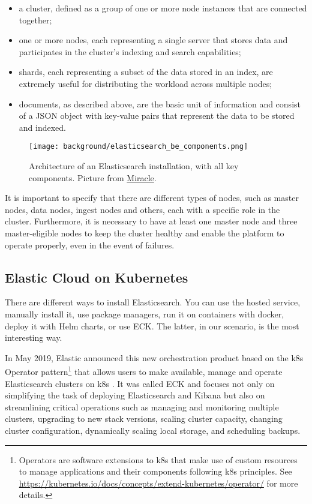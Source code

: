 \documentclass[../thesis.tex]{subfiles}
\begin{document}
\begin{itemize}
    \item a cluster, defined as a group of one or more node instances that are connected together;
    \item one or more nodes, each representing a single server that stores data and participates in the cluster's indexing and search capabilities;
    \item shards, each representing a subset of the data stored in an index, are extremely useful for distributing the workload across multiple nodes;
    \item documents, as described above, are the basic unit of information and consist of a \acrshort{JSON} object with key-value pairs that represent the data to be stored and indexed.
\end{itemize}

\begin{figure}[H]
    \centering
    \texttt{[image: background/elasticsearch\_be\_components.png]}
    \caption[Elasticsearch backend components]{Architecture of an Elasticsearch installation, with all key components. Picture from \href{https://blog.miraclesoft.com/wp-content/uploads/2023/08/xelasticsearch-image-1-1024x643.png.pagespeed.ic.DhHOg8eTFd.webp}{Miracle}.}
    \label{fig:elasticsearch_be_components}
\end{figure}

It is important to specify that there are different types of nodes, such as master nodes, data nodes, ingest nodes and others, each with a specific role in the cluster. Furthermore, it is necessary to have at least one master node and three master-eligible nodes to keep the cluster healthy and enable the platform to operate properly, even in the event of failures.

\subsection{Elastic Cloud on Kubernetes}
There are different ways to install Elasticsearch. You can use the hosted service, manually install it, use package managers, run it on \gls{container}s with \gls{docker}, deploy it with Helm charts, or use \acrfull{ECK}. The latter, in our scenario, is the most interesting way.

In May 2019, Elastic announced this new orchestration product based on the \gls{k8s} Operator pattern\footnote{Operators are software extensions to \gls{k8s} that make use of custom resources to manage applications and their components following \gls{k8s} principles. See \href{https://kubernetes.io/docs/concepts/extend-kubernetes/operator/}{https://kubernetes.io/docs/concepts/extend-kubernetes/operator/} for more details.} that allows users to make available, manage and operate Elasticsearch clusters on \gls{k8s} \cite{site:elasticsearch_kubernetes}. It was called \acrshort{ECK} and focuses not only on simplifying the task of deploying Elasticsearch and Kibana but also on streamlining critical operations such as managing and monitoring multiple clusters, upgrading to new stack versions, scaling cluster capacity, changing cluster configuration, dynamically scaling local storage, and scheduling backups.
\end{document}

